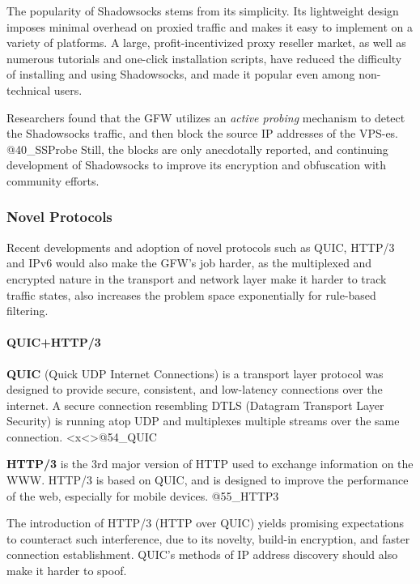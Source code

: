 The popularity of Shadowsocks stems from its simplicity. Its lightweight
design imposes minimal overhead on proxied traffic and makes it easy to
implement on a variety of platforms. A large, profit-incentivized proxy
reseller market, as well as numerous tutorials and one-click
installation scripts, have reduced the difficulty of installing and
using Shadowsocks, and made it popular even among non-technical users.

Researchers found that the GFW utilizes an \emph{active probing}
mechanism to detect the Shadowsocks traffic, and then block the source
IP addresses of the VPS-es. @40\_SSProbe Still, the blocks are only
anecdotally reported, and continuing development of Shadowsocks to
improve its encryption and obfuscation with community efforts.

\hypertarget{novel-protocols}{%
\subsubsection{Novel Protocols}\label{novel-protocols}}

Recent developments and adoption of novel protocols such as QUIC, HTTP/3
and IPv6 would also make the GFW's job harder, as the multiplexed and
encrypted nature in the transport and network layer make it harder to
track traffic states, also increases the problem space exponentially for
rule-based filtering.

\hypertarget{quichttp3}{%
\paragraph{QUIC+HTTP/3}\label{quichttp3}}

\textbf{QUIC} (Quick UDP Internet Connections) is a transport layer
protocol was designed to provide secure, consistent, and low-latency
connections over the internet. A secure connection resembling DTLS
(Datagram Transport Layer Security) is running atop UDP and multiplexes
multiple streams over the same connection.
\textless x\textless\textgreater{}@54\_QUIC

\textbf{HTTP/3} is the 3rd major version of HTTP used to exchange
information on the WWW. HTTP/3 is based on QUIC, and is designed to
improve the performance of the web, especially for mobile devices.
@55\_HTTP3

The introduction of HTTP/3 (HTTP over QUIC) yields promising
expectations to counteract such interference, due to its novelty,
build-in encryption, and faster connection establishment. QUIC's methods
of IP address discovery should also make it harder to spoof.

